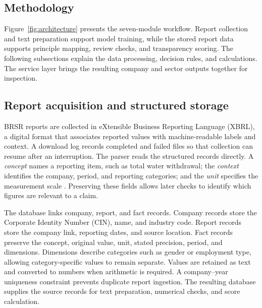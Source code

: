 \begin{lrbox}{\methodologyoverviewbox}
\begin{minipage}{\linewidth}
\section{Methodology}
\label{sec:methodology}

Figure~\ref{fig:architecture} presents the seven-module workflow. Report collection and text preparation support model training, while the stored report data supports principle mapping, review checks, and transparency scoring. The following subsections explain the data processing, decision rules, and calculations. The service layer brings the resulting company and sector outputs together for inspection.


\end{minipage}
\end{lrbox}
\ifdim\dimexpr\ht\methodologyoverviewbox+\dp\methodologyoverviewbox\relax>\textheight
\PackageError{GRASP-layout}{Methodology overview exceeds one page}{Reduce the diagram height.}
\fi
\noindent\usebox{\methodologyoverviewbox}
\par\clearpage

\subsection{Report acquisition and structured storage}
\label{sec:ingestion}

BRSR reports are collected in eXtensible Business Reporting Language (XBRL), a digital format that associates reported values with machine-readable labels and context. A download log records completed and failed files so that collection can resume after an interruption. The parser reads the structured records directly. A \emph{concept} names a reporting item, such as total water withdrawal; the \emph{context} identifies the company, period, and reporting categories; and the \emph{unit} specifies the measurement scale \cite{xbrl2013}. Preserving these fields allows later checks to identify which figures are relevant to a claim.

The database links company, report, and fact records. Company records store the Corporate Identity Number (CIN), name, and industry code. Report records store the company link, reporting dates, and source location. Fact records preserve the concept, original value, unit, stated precision, period, and dimensions. Dimensions describe categories such as gender or employment type, allowing category-specific values to remain separate. Values are retained as text and converted to numbers when arithmetic is required. A company--year uniqueness constraint prevents duplicate report ingestion. The resulting database supplies the source records for text preparation, numerical checks, and score calculation.

